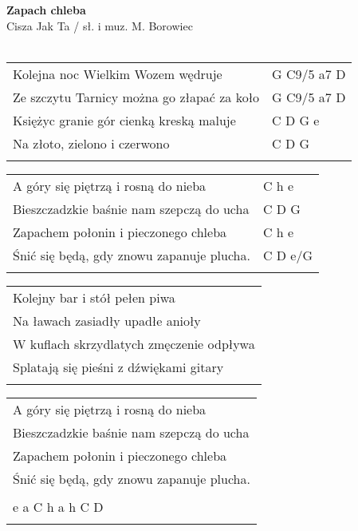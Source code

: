 \documentclass[a5paper]{article}
\begin{document}


\noindent
\fontsize{12pt}{15pt}\selectfont
\textbf{Zapach chleba} \\
\fontsize{8pt}{10pt}\selectfont
Cisza Jak Ta / sł. i muz. M. Borowiec \\ \\
\fontsize{10pt}{12pt}\selectfont
{}
\begin{tabular}{@{}p{8.00cm}p{3cm}@{}}
\noindent
Kolejna noc Wielkim Wozem wędruje & G C9/5 a7 D \\
Ze szczytu Tarnicy można go złapać za koło & G C9/5 a7 D \\
Księżyc granie gór cienką kreską maluje & C D G e \\
Na złoto, zielono i czerwono & C D G \\ \\
\end{tabular}

\noindent
\begin{tabular}{@{}p{7.00cm}p{3cm}@{}}
A góry się piętrzą i rosną do nieba & C h e \\
Bieszczadzkie baśnie nam szepczą do ucha & C D G \\
Zapachem połonin i pieczonego chleba & C h e \\
Śnić się będą, gdy znowu zapanuje plucha. & C D e/G \\ \\
\end{tabular}

\noindent
\begin{tabular}{@{}p{8.00cm}@{}}
Kolejny bar i stół pełen piwa \\
Na ławach zasiadły upadłe anioły \\
W kuflach skrzydlatych zmęczenie odpływa \\
Splatają się pieśni z dźwiękami gitary \\ \\
\end{tabular}

\noindent
\begin{tabular}{@{}p{7.00cm}@{}}
A góry się piętrzą i rosną do nieba \\
Bieszczadzkie baśnie nam szepczą do ucha \\
Zapachem połonin i pieczonego chleba \\
Śnić się będą, gdy znowu zapanuje plucha. \\ \\

e a C h a h C D \\ \\
\end{tabular}
\end{document}
